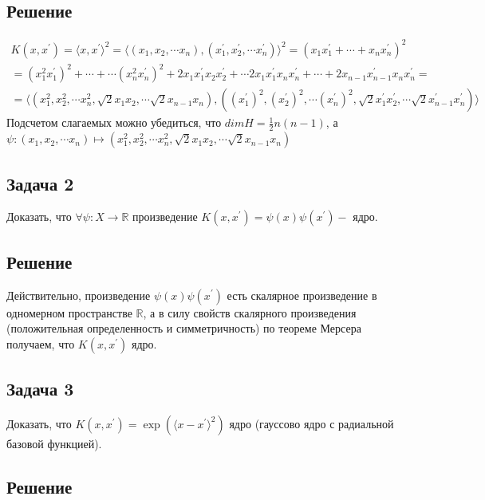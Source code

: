 \subsection{Решение}
\begin{align*}
    K(x, x^{\prime}) = \langle x, x^{\prime} \rangle^2 = \langle (x_1, x_2, \cdots x_n), (x_1^{\prime}, x_2^{\prime}, \cdots x_n^{\prime}) \rangle^2 = (x_1x_1^{\prime} + \cdots + x_nx_n^{\prime})^2      \\
    = (x_1^2x_1^{\prime})^2 + \cdots + \cdots (x_n^2x_n^{\prime})^2 + 2x_1x_1^{\prime}x_2x_2^{\prime} + \cdots 2x_1x_1^{\prime}x_{n}x_n^{\prime} + \cdots + 2x_{n-1}x_{n-1}^{\prime}x_{n}x_{n}^{\prime}  = \\
    = \langle(x_1^2, x_2^2, \cdots x_n^2, \sqrt{2}x_1x_2, \cdots \sqrt{2}x_{n-1}x_n),((x_1^{\prime})^2, (x_2^{\prime})^2, \cdots (x_n^{\prime})^2, \sqrt{2}x_1^{\prime}x_2^{\prime},\cdots \sqrt{2}x_{n-1}^{\prime}x_{n}^{\prime})\rangle
\end{align*}
Подсчетом слагаемых можно убедиться, что $ dimH = \frac{1}{2}n(n-1) $, а $\psi:(x_1, x_2, \cdots x_n) \mapsto(x_1^2, x_2^2, \cdots x_n^2, \sqrt{2}x_1x_2, \cdots \sqrt{2}x_{n-1}x_n)$

\subsection{Задача 2}
Доказать, что $\forall \psi: X \rightarrow \mathbb{R}$ произведение $K\left(x, x^{\prime}\right)=\psi(x) \psi\left(x^{\prime}\right)-$ ядро.
\subsection{Решение}

Действительно, произведение $\psi(x) \psi(x^{\prime})$ есть скалярное произведение в одномерном пространстве $\mathbb{R}$, а в силу свойств скалярного произведения
(положительная определенность и симметричность) по теореме Мерсера получаем, что $K(x, x^{\prime})$ ядро.

\subsection{Задача 3}
Доказать, что $K(x, x^{\prime})=\exp(\langle x - x^{\prime} \rangle^2)$ ядро (гауссово ядро с радиальной базовой функцией).
\subsection{Решение}

